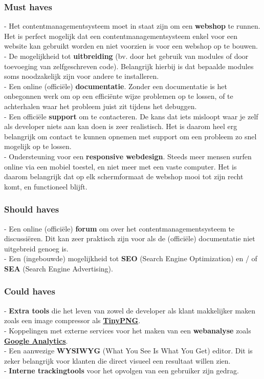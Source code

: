 \subsubsection{Must haves}
- Het contentmanagementsysteem moet in staat zijn om een \textbf{webshop} te runnen. Het is perfect mogelijk dat een contentmanagementsysteem enkel voor een website kan gebruikt worden en niet voorzien is voor een webshop op te bouwen. \\
- De mogelijkheid tot \textbf{uitbreiding} (bv. door het gebruik van modules of door toevoeging van zelfgeschreven code). Belangrijk hierbij is dat bepaalde modules soms noodzakelijk zijn voor andere te installeren. \autocite{DeMits2009} \\
- Een online (officiële) \textbf{documentatie}. Zonder een documentatie is het onbegonnen werk om op een efficiënte wijze problemen op te lossen, of te achterhalen waar het probleem juist zit tijdens het debuggen.\\
- Een officiële \textbf{support} om te contacteren. De kans dat iets misloopt waar je zelf als developer niets aan kan doen is zeer realistisch. Het is daarom heel erg belangrijk om contact te kunnen opnemen met support om een probleem zo snel mogelijk op te lossen.\\
- Ondersteuning voor een \textbf{responsive webdesign}. Steeds meer mensen surfen online via een mobiel toestel, en niet meer met een vaste computer. Het is daarom belangrijk dat op elk schermformaat de webshop mooi tot zijn recht komt, en functioneel blijft. \autocite{Meijer2012}\\
\subsubsection{Should haves}
- Een online (officiële) \textbf{forum} om over het contentmanagementsysteem te discussiëren. Dit kan zeer praktisch zijn voor als de (officiële) documentatie niet uitgebreid genoeg is.\\
- Een (ingebouwde) mogelijkheid tot \textbf{SEO} (Search Engine Optimization) en / of \textbf{SEA} (Search Engine Advertising).\\ 
\subsubsection{Could haves}
- \textbf{Extra tools} die het leven van zowel de developer als klant makkelijker maken zoals een image compressor als \textbf{\href{https://wordpress.org/plugins/tiny-compress-images/}{TinyPNG}}.\\
- Koppelingen met externe services voor het maken van een \textbf{webanalyse} zoals \textbf{\href{https://marketingplatform.google.com/intl/nl/about/analytics/}{Google Analytics}}.\\
- Een aanwezige \textbf{WYSIWYG} (What You See Is What You Get) editor. Dit is zeker belangrijk voor klanten die direct visueel een resultaat willen zien. \autocite{Behiels2021}\\
- \textbf{Interne trackingtools} voor het opvolgen van een gebruiker zijn gedrag. \autocite{DeBruijn2013} 
